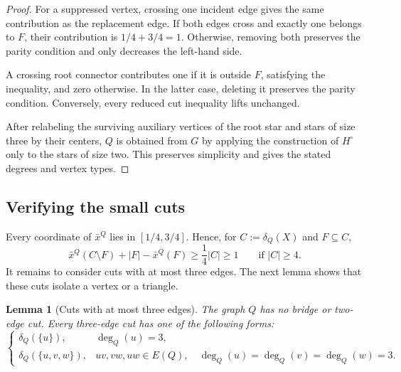 \documentclass[11pt]{amsart}
\newcommand{\1}{\mathbbm{1}}
\newtheorem{lemma}[theorem]{Lemma}
\begin{document}
\begin{proof} 
For a suppressed vertex, crossing one incident edge gives
the same contribution as the replacement edge.
If both edges cross and exactly one belongs to $F$, their
contribution is $1/4+3/4=1$. Otherwise, removing both
preserves the parity condition and only decreases the
left-hand side.

A crossing root connector contributes one if it is outside
$F$, satisfying the inequality, and zero otherwise.
In the latter case, deleting it preserves the parity
condition. Conversely, every reduced cut inequality lifts
unchanged.

After relabeling the surviving auxiliary vertices of the
root star and stars of size three by their centers,
$Q$ is obtained from $G$ by applying the construction of
$H^\circ$ only to the stars of size two.
This preserves simplicity and gives the stated degrees
and vertex types.
\end{proof}



\subsection{Verifying the small cuts}

Every coordinate of $\bar x^Q$ lies in $[1/4,3/4]$.
Hence, for $C:=\delta_Q(X)$ and $F\subseteq C$,
\begin{equation}
\label{eq:quartic-large-cuts}
 \bar x^Q(C\setminus F)+|F|-\bar x^Q(F)
 \ge\frac14|C|
 \ge1
 \qquad\text{if }|C|\ge4.
\end{equation}
It remains to consider cuts with at most three edges.
The next lemma shows that these cuts isolate a vertex
or a triangle.

\begin{lemma}[Cuts with at most three edges]
\label{lem:quartic-small-cuts}
The graph $Q$ has no bridge or two-edge cut.
Every three-edge cut has one of the following forms:
\[
 \begin{cases}
 \delta_Q(\{u\}),
   &\deg_Q(u)=3,\\[3pt]
 \delta_Q(\{u,v,w\}),
   &uv,vw,uw\in E(Q),\quad
    \deg_Q(u)=\deg_Q(v)=\deg_Q(w)=3.
 \end{cases}
\]
\end{lemma}
\end{document}
